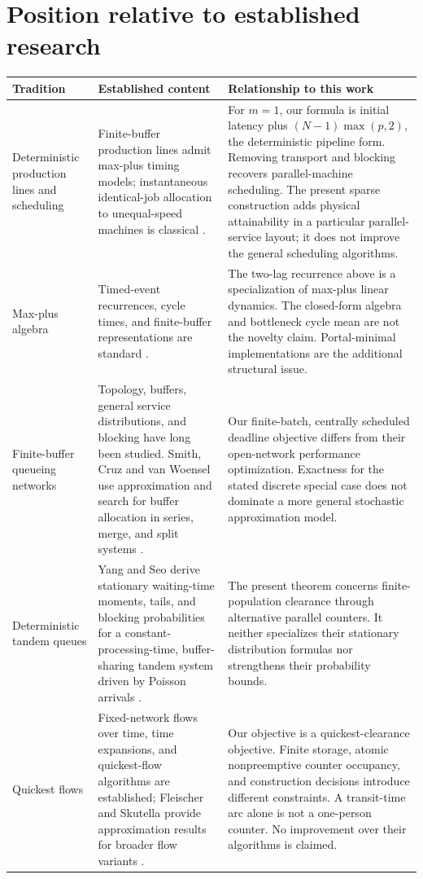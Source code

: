\documentclass[11pt]{article}
\begin{document}
\section{Position relative to established research}
\renewcommand{\arraystretch}{1.14}
\begin{longtable}{>{\raggedright\arraybackslash}p{.23\linewidth}>{\raggedright\arraybackslash}p{.32\linewidth}>{\raggedright\arraybackslash}p{.37\linewidth}}
\toprule
Tradition&Established content&Relationship to this work\\\midrule\endhead
Deterministic production lines and scheduling&Finite-buffer production lines admit max-plus timing models; instantaneous identical-job allocation to unequal-speed machines is classical \cite{seleim,dessouky}.&For $m=1$, our formula is initial latency plus $(N-1)\max(p,2)$, the deterministic pipeline form. Removing transport and blocking recovers parallel-machine scheduling. The present sparse construction adds physical attainability in a particular parallel-service layout; it does not improve the general scheduling algorithms.\\
Max-plus algebra&Timed-event recurrences, cycle times, and finite-buffer representations are standard \cite{bcoq,seleim}.&The two-lag recurrence above is a specialization of max-plus linear dynamics. The closed-form algebra and bottleneck cycle mean are not the novelty claim. Portal-minimal implementations are the additional structural issue.\\
Finite-buffer queueing networks&Topology, buffers, general service distributions, and blocking have long been studied. Smith, Cruz and van Woensel use approximation and search for buffer allocation in series, merge, and split systems \cite{smith}.&Our finite-batch, centrally scheduled deadline objective differs from their open-network performance optimization. Exactness for the stated discrete special case does not dominate a more general stochastic approximation model.\\
Deterministic tandem queues&Yang and Seo derive stationary waiting-time moments, tails, and blocking probabilities for a constant-processing-time, buffer-sharing tandem system driven by Poisson arrivals \cite{yang}.&The present theorem concerns finite-population clearance through alternative parallel counters. It neither specializes their stationary distribution formulas nor strengthens their probability bounds.\\
Quickest flows&Fixed-network flows over time, time expansions, and quickest-flow algorithms are established; Fleischer and Skutella provide approximation results for broader flow variants \cite{fleischer}.&Our objective is a quickest-clearance objective. Finite storage, atomic nonpreemptive counter occupancy, and construction decisions introduce different constraints. A transit-time arc alone is not a one-person counter. No improvement over their algorithms is claimed.\\

\end{longtable}
\end{document}
